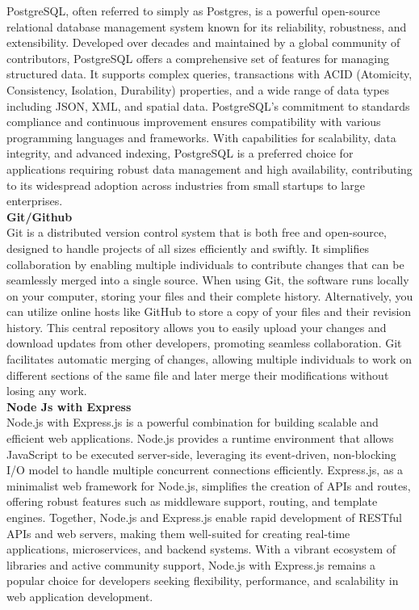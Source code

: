 PostgreSQL, often referred to simply as Postgres, is a powerful open-source relational database management system known for its reliability, robustness, and extensibility. Developed over decades and maintained by a global community of contributors, PostgreSQL offers a comprehensive set of features for managing structured data. It supports complex queries, transactions with ACID (Atomicity, Consistency, Isolation, Durability) properties, and a wide range of data types including JSON, XML, and spatial data. PostgreSQL's commitment to standards compliance and continuous improvement ensures compatibility with various programming languages and frameworks. With capabilities for scalability, data integrity, and advanced indexing, PostgreSQL is a preferred choice for applications requiring robust data management and high availability, contributing to its widespread adoption across industries from small startups to large enterprises. \\
\textbf{Git/Github}\\
Git is a distributed version control system that is both free and open-source, designed to handle projects of all sizes efficiently and swiftly. It simplifies collaboration by enabling multiple individuals to contribute changes that can be seamlessly merged into a single source. When using Git, the software runs locally on your computer, storing your files and their complete history. Alternatively, you can utilize online hosts like GitHub to store a copy of your files and their revision history. This central repository allows you to easily upload your changes and download updates from other developers, promoting seamless collaboration. Git facilitates automatic merging of changes, allowing multiple individuals to work on different sections of the same file and later merge their modifications without losing any work.\\
\textbf{Node Js with Express}\\
Node.js with Express.js is a powerful combination for building scalable and efficient web applications. Node.js provides a runtime environment that allows JavaScript to be executed server-side, leveraging its event-driven, non-blocking I/O model to handle multiple concurrent connections efficiently. Express.js, as a minimalist web framework for Node.js, simplifies the creation of APIs and routes, offering robust features such as middleware support, routing, and template engines. Together, Node.js and Express.js enable rapid development of RESTful APIs and web servers, making them well-suited for creating real-time applications, microservices, and backend systems. With a vibrant ecosystem of libraries and active community support, Node.js with Express.js remains a popular choice for developers seeking flexibility, performance, and scalability in web application development.\\
\\

